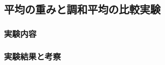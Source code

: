 \documentclass{deimj}
\begin{document}
\subsection{平均の重みと調和平均の比較実験}
\label{subsec:A comparative experiment of harmonic mean over the average weight}
\subsubsection{実験内容}
\subsubsection{実験結果と考察}



\end{document}
